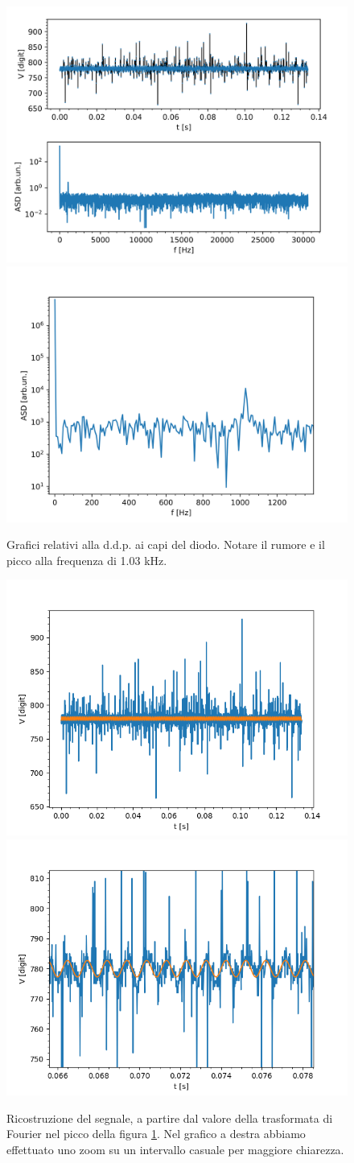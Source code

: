 \documentclass{article}[a4paper, oneside,11pt]
\begin{document}
\begin{figure}[H]
    \centering
    \includegraphics[width=0.45\columnwidth]{img/ese9/dataEDJ-vd-1.75V.png}
    \includegraphics[width=0.48\columnwidth]{img/ese9/dataEDJ-vd-1.75V-tagl.png}
    \caption{Grafici relativi alla d.d.p. ai capi del diodo. Notare il rumore e il picco alla frequenza di 1.03 kHz.}
    \label{fig:ese9-vd}
\end{figure}

\begin{figure}[H]
    \centering
    \includegraphics[width=0.45\columnwidth]{img/ese9/dataEDJ-vd-1.75V-lockin.png}
    \includegraphics[width=0.45\columnwidth]{img/ese9/dataEDJ-vd-1.75V-lockin-tagl.png}
    \caption{Ricostruzione del segnale, a partire dal valore della trasformata di Fourier nel picco della figura \ref{fig:ese9-vd}. Nel grafico a destra abbiamo effettuato uno zoom su un intervallo casuale per maggiore chiarezza.}
    \label{fig:ese9-lockin}
\end{figure}
\end{document}
